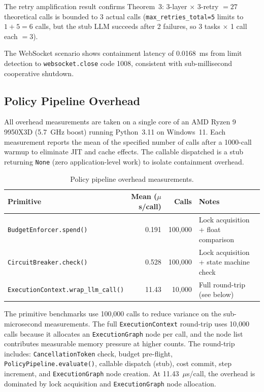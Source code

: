 \documentclass[11pt]{article}
\begin{document}
The retry amplification result confirms Theorem~3: 3-layer $\times$ 3-retry
$= 27$ theoretical calls is bounded to 3 actual calls
(\texttt{max\_retries\_total=5} limits to $1{+}5{=}6$ calls, but the stub LLM
succeeds after 2 failures, so 3 tasks $\times$ 1 call each $= 3$).

The WebSocket scenario shows containment latency of 0.0168~ms from limit
detection to \texttt{websocket.close} code 1008, consistent with
sub-millisecond cooperative shutdown.

\subsection{Policy Pipeline Overhead}

All overhead measurements are taken on a single core of an AMD Ryzen 9
9950X3D (5.7~GHz boost) running Python~3.11 on Windows~11. Each measurement
reports the mean of the specified number of calls after a 1000-call warmup to
eliminate JIT and cache effects. The callable dispatched is a stub returning
\texttt{None} (zero application-level work) to isolate containment overhead.

\begin{table}[!ht]
\centering
\caption{Policy pipeline overhead measurements.}
\label{tab:overhead}
\begin{tabular}{@{}lrrl@{}}
\toprule
\textbf{Primitive} & \textbf{Mean ($\mu$s/call)} & \textbf{Calls} &
\textbf{Notes} \\
\midrule
\texttt{BudgetEnforcer.spend()} & 0.191 & 100,000 &
Lock acquisition + float comparison \\
\texttt{CircuitBreaker.check()} & 0.528 & 100,000 &
Lock acquisition + state machine check \\
\texttt{ExecutionContext.wrap\_llm\_call()} & 11.43 & 10,000 &
Full round-trip (see below) \\
\bottomrule
\end{tabular}
\end{table}

The primitive benchmarks use 100,000 calls to reduce variance on the
sub-microsecond measurements. The full \texttt{ExecutionContext} round-trip
uses 10,000 calls because it allocates an \texttt{ExecutionGraph} node per
call, and the node list contributes measurable memory pressure at higher
counts. The round-trip includes: \texttt{CancellationToken} check, budget
pre-flight, \texttt{PolicyPipeline.evaluate()}, callable dispatch (stub),
cost commit, step increment, and \texttt{ExecutionGraph} node creation. At
11.43~$\mu$s/call, the overhead is dominated by lock acquisition and
\texttt{ExecutionGraph} node allocation.
\end{document}
